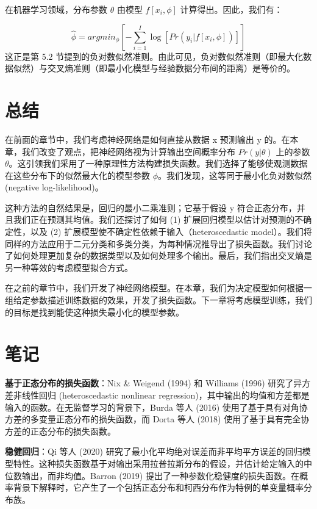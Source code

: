 \documentclass[lang=cn,newtx,10pt,scheme=chinese]{elegantbook}
\begin{document}
在机器学习领域，分布参数 \(\theta\) 由模型 \(f[x_i, \phi]\) 计算得出。因此，我们有：

\begin{equation}
\hat{\phi} = argmin_{\phi} \left[ -\sum_{i=1}^{I} \log [Pr(y_i|f[x_i, \phi])] \right] 
\end{equation}
这正是第 5.2 节提到的负对数似然准则。由此可见，负对数似然准则（即最大化数据似然）与交叉熵准则（即最小化模型与经验数据分布间的距离）是等价的。

\section{总结}

在前面的章节中，我们考虑神经网络是如何直接从数据 x 预测输出 y 的。在本章，我们改变了观点，把神经网络视为计算输出空间概率分布 \(Pr(y|\theta)\) 上的参数 \(\theta\)。这引领我们采用了一种原理性方法构建损失函数。我们选择了能够使观测数据在这些分布下的似然最大化的模型参数 \(\phi\)。我们发现，这等同于最小化负对数似然 (negative log-likelihood)。

这种方法的自然结果是，回归的最小二乘准则；它基于假设 y 符合正态分布，并且我们正在预测其均值。我们还探讨了如何 (1) 扩展回归模型以估计对预测的不确定性，以及 (2) 扩展模型使不确定性依赖于输入（heteroscedastic model）。我们将同样的方法应用于二元分类和多类分类，为每种情况推导出了损失函数。我们讨论了如何处理更加复杂的数据类型以及如何处理多个输出。最后，我们指出交叉熵是另一种等效的考虑模型拟合方式。

在之前的章节中，我们开发了神经网络模型。在本章，我们为决定模型如何根据一组给定参数描述训练数据的效果，开发了损失函数。下一章将考虑模型训练，我们的目标是找到能使这种损失最小化的模型参数。


\section{笔记}

\textbf{基于正态分布的损失函数}：Nix \& Weigend (1994) 和 Williams (1996) 研究了异方差非线性回归 (heteroscedastic nonlinear regression)，其中输出的均值和方差都是输入的函数。在无监督学习的背景下，Burda 等人 (2016) 使用了基于具有对角协方差的多变量正态分布的损失函数，而 Dorta 等人 (2018) 使用了基于具有完全协方差的正态分布的损失函数。

\textbf{稳健回归}：Qi 等人 (2020) 研究了最小化平均绝对误差而非平均平方误差的回归模型特性。这种损失函数基于对输出采用拉普拉斯分布的假设，并估计给定输入的中位数输出，而非均值。Barron (2019) 提出了一种参数化稳健度的损失函数。在概率背景下解释时，它产生了一个包括正态分布和柯西分布作为特例的单变量概率分布族。
\end{document}
